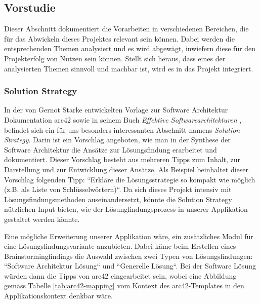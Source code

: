 \subsection{Vorstudie}
Dieser Abschnitt dokumentiert die Vorarbeiten in verschiedenen Bereichen, die für das Abwickeln dieses Projektes relevant sein können. Dabei werden die entsprechenden Themen analysiert und es wird abgewägt, inwiefern diese für den Projekterfolg von Nutzen sein können. Stellt sich heraus, dass eines der analysierten Themen sinnvoll und machbar ist, wird es in das Projekt integriert.

\subsubsection{Solution Strategy}\label{sec:sol-strategy}

In der von Gernot Starke entwickelten Vorlage zur Software Architektur Dokumentation arc42 \cite{arc-42} sowie in seinem Buch \textit{Effektive Softwarearchitekturen} \cite{eswa}, befindet sich ein für uns besonders interessanten Abschnitt namens \textit{Solution Strategy}. Darin ist ein Vorschlag angeboten, wie man in der Synthese der Software Architektur die Ansätze zur Lösungsfindung erarbeitet und dokumentiert. Dieser Vorschlag besteht aus mehreren Tipps zum Inhalt, zur Darstellung und zur Entwicklung dieser Ansätze. Als Beispiel beinhaltet dieser Vorschlag folgenden Tipp: ``Erkläre die Lösungsstrategie so kompakt wie möglich (z.B. als Liste von Schlüsselwörtern)``. Da sich dieses Projekt intensiv mit Lösungsfindungsmethoden auseinandersetzt, könnte die Solution Strategy nützlichen Input bieten, wie der Lösungfindungsprozess in unserer Applikation gestaltet werden könnte. 

Eine mögliche Erweiterung unserer Applikation wäre, ein zusätzliches Modul für eine Lösungsfindungsvariante anzubieten. Dabei käme beim Erstellen eines Brainstormingfindings die Auswahl zwischen zwei Typen von Lösungsfindungen: ``Software Architektur Lösung`` und ``Generelle Lösung``. Bei der Software Lösung würden dann die Tipps von arc42 eingearbeitet sein, wobei eine Abbildung gemäss Tabelle \ref{tab:arc42-mapping} vom Kontext des arc42-Templates in den Applikationskontext denkbar wäre.

